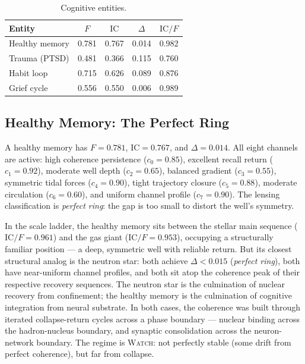 \documentclass[
  aps,
  prd,
  twocolumn,
  superscriptaddress,
  nofootinbib,
  floatfix
]{revtex4-2}
\newcommand{\regime}[1]{\textsc{#1}}
\newcommand{\IC}{\mathrm{IC}}
\begin{document}
\begin{table}[t]
\caption{\label{tab:cognitive}Cognitive entities.}
\begin{ruledtabular}
\begin{tabular}{lcccc}
Entity & $F$ & $\IC$ & $\Delta$ & $\IC/F$ \\
\hline
Healthy memory     & 0.781 & 0.767 & 0.014 & 0.982 \\
Trauma (PTSD)      & 0.481 & 0.366 & 0.115 & 0.760 \\
Habit loop         & 0.715 & 0.626 & 0.089 & 0.876 \\
Grief cycle        & 0.556 & 0.550 & 0.006 & 0.989 \\
\end{tabular}
\end{ruledtabular}
\end{table}


\subsection{Healthy Memory: The Perfect Ring}

A healthy memory has $F = 0.781$, $\IC = 0.767$, and
$\Delta = 0.014$.  All eight channels are active: high
coherence persistence ($c_0 = 0.85$), excellent recall return
($c_1 = 0.92$), moderate well depth ($c_2 = 0.65$), balanced
gradient ($c_3 = 0.55$), symmetric tidal forces
($c_4 = 0.90$), tight trajectory closure ($c_5 = 0.88$),
moderate circulation ($c_6 = 0.60$), and uniform channel
profile ($c_7 = 0.90$).  The lensing classification is
\emph{perfect ring}: the gap is too small to distort the
well's symmetry.

In the scale ladder, the healthy memory sits between the
stellar main sequence ($\IC/F = 0.961$) and the gas giant
($\IC/F = 0.953$), occupying a structurally familiar
position --- a deep, symmetric well with reliable return.
But its closest structural analog is the neutron star:
both achieve $\Delta < 0.015$ (\emph{perfect ring}), both
have near-uniform channel profiles, and both sit atop the
coherence peak of their respective recovery sequences.
The neutron star is the culmination of nuclear recovery
from confinement; the healthy memory is the culmination of
cognitive integration from neural substrate.  In both cases,
the coherence was built through iterated collapse-return
cycles across a phase boundary --- nuclear binding across
the hadron-nucleus boundary, and synaptic consolidation
across the neuron-network boundary.
The regime is \regime{Watch}: not perfectly stable (some
drift from perfect coherence), but far from collapse.
\end{document}
